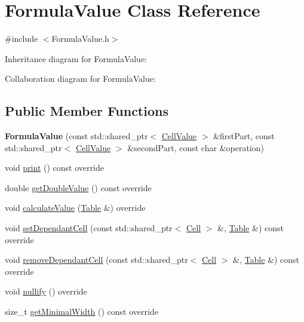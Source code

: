 \hypertarget{classFormulaValue}{}\section{Formula\+Value Class Reference}
\label{classFormulaValue}


{\ttfamily \#include $<$Formula\+Value.\+h$>$}



Inheritance diagram for Formula\+Value\+:


Collaboration diagram for Formula\+Value\+:
\subsection*{Public Member Functions}
\begin{DoxyCompactItemize}
\item 
\mbox{\label{classFormulaValue_a4f7441fe3525e963ca8b13c7c7209a06}} 
{\bfseries Formula\+Value} (const std\+::shared\+\_\+ptr$<$ \hyperlink{classCellValue}{Cell\+Value} $>$ \&first\+Part, const std\+::shared\+\_\+ptr$<$ \hyperlink{classCellValue}{Cell\+Value} $>$ \&second\+Part, const char \&operation)
\item 
void \hyperlink{classFormulaValue_a62217eb27ea02ca26f7636afb8f75b73}{print} () const override
\item 
double \hyperlink{classFormulaValue_a164f0c3e517db2fb4423e27e54ca4a60}{get\+Double\+Value} () const override
\item 
void \hyperlink{classFormulaValue_a8b8462588f3d533f6a5a39adee4f3eba}{calculate\+Value} (\hyperlink{classTable}{Table} \&) override
\item 
void \hyperlink{classFormulaValue_a0532fb20f1ea829fd8ec7fa32c96105a}{set\+Dependant\+Cell} (const std\+::shared\+\_\+ptr$<$ \hyperlink{classCell}{Cell} $>$ \&, \hyperlink{classTable}{Table} \&) const override
\item 
void \hyperlink{classFormulaValue_a7081172a6793644e3375c81f76ed1ba8}{remove\+Dependant\+Cell} (const std\+::shared\+\_\+ptr$<$ \hyperlink{classCell}{Cell} $>$ \&, \hyperlink{classTable}{Table} \&) const override
\item 
void \hyperlink{classFormulaValue_a43f76e805f909e32823cf44d4d1c6cb8}{nullify} () override
\item 
size\+\_\+t \hyperlink{classFormulaValue_a13abe74f12b5b201620d09e50237b195}{get\+Minimal\+Width} () const override
\end{DoxyCompactItemize}


